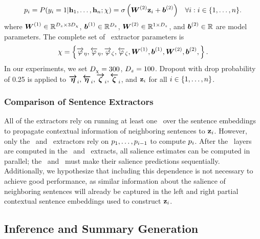 \\[-40pt]
\begin{align}
p_i =    P(y_i=1|\mathbf{h}_1, \ldots,\mathbf{h}_n;\chi)& = 
            \sigma\left(\boldsymbol{W}^{(2)} \mathbf{z}_i + \boldsymbol{b}^{(2)}  
            \right) &
    \forall i : i \in \{1,\ldots,n\}.
\end{align}
where $\boldsymbol{W}^{(1)} \in \mathbb{R}^{{D_z} \times 3{D_\chi}}$,
$\boldsymbol{b}^{(1)} \in \mathbb{R}^{{D_z}}$, 
$\boldsymbol{W}^{(2)} \in \mathbb{R}^{1 \times {D_z}}$, and
$\boldsymbol{b}^{(2)} \in \mathbb{R}$ are model parameters.
The complete set of \stsext~extractor parameters is 
\[\chi = \left\{ {\overrightarrow{\varphi}_\eta}, {\overleftarrow{\varphi}_\eta},
        {\overrightarrow{\varphi}_\zeta}, {\overleftarrow{\varphi}_\zeta}, \boldsymbol{W}^{(1)}, \boldsymbol{b}^{(1)}, \boldsymbol{W}^{(2)}, \boldsymbol{b}^{(2)}, \right\}. \]
In our experiments, we set ${D_\chi}=300$, ${D_z}=100$.  Dropout
with drop probability of 0.25 is applied to $\boldsymbol{\overrightarrow{\eta}}_i,
\boldsymbol{\overleftarrow{\eta}}_i, \boldsymbol{\overrightarrow{\zeta}}_i, \boldsymbol{\overleftarrow{\zeta}}_i$, and $\mathbf{z}_i$ for
all $i \in \{1,\ldots,n\}$.

\subsubsection{Comparison of Sentence Extractors}

All of the extractors rely on running at least one \gru~over the sentence
embeddings to propagate contextual information of neighboring sentences to
$\mathbf{z}_i$. However, only the \clext~and \srext~extractors rely on
$p_1,\ldots,p_{i-1}$ to compute $p_i$.  After the \gru~layers are
computed in the \rnnext~and \stsext~extracts, all salience estimates can be
computed in parallel; the \clext~and \srext~must make their salience
predictions sequentially.  Additionally, we hypothesize that including this
dependence is not necessary to achieve good performance, as similar
information about the salience of neighboring sentences will already be
captured in the left and right partial contextual sentence embeddings used to
construct $\mathbf{z}_i$.

\subsection{Inference and Summary Generation} \label{sec:inference}

